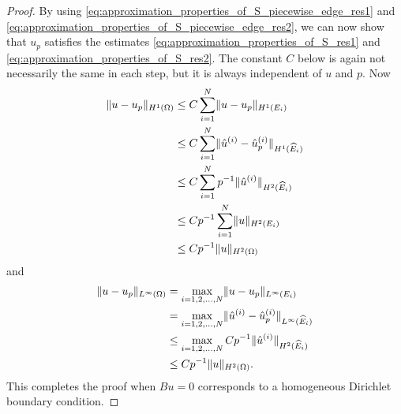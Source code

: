 \documentclass[english, 12pt, a4paper, sci, utf8, a-2b, online]{aaltothesis}
\theoremstyle{definition}
\theoremstyle{plain}
\DeclarePairedDelimiter\norm{\lVert}{\rVert}
\numberwithin{equation}{section}
\begin{document}
\begin{proof}
    By using \eqref{eq:approximation_properties_of_S_piecewise_edge_res1}
    and \eqref{eq:approximation_properties_of_S_piecewise_edge_res2},
    we can now show that $u_p$ satisfies the estimates
    \eqref{eq:approximation_properties_of_S_res1} and
    \eqref{eq:approximation_properties_of_S_res2}.
    The constant $C$ below is again not necessarily the same in each step,
    but it is always independent of $u$ and $p$. Now
    \begin{align*}
        \norm{u - u_p}_{H^1(\Omega)}
        &\leq C \sum_{i=1}^{N} \norm{u - u_p}_{H^1(E_i)} \\
        &\leq C \sum_{i=1}^{N}
            \norm{\hat{u}^{(i)} - \hat{u}_p^{(i)}}_{H^1(\widehat{E}_i)} \\
        &\leq C \sum_{i=1}^{N} p^{-1} \norm{\hat{u}^{(i)}}_{H^2(\widehat{E}_i)} \\
        &\leq C p^{-1} \sum_{i=1}^{N} \norm{u}_{H^2(E_i)} \\
        &\leq C p^{-1} \norm{u}_{H^2(\Omega)}
    \end{align*}
    and
    \begin{align*}
        \norm{u - u_p}_{L^{\infty}(\Omega)}
        &= \max_{i=1,2,\dotsc,N} \norm{u - u_p}_{L^{\infty}(E_i)} \\
        &= \max_{i=1,2,\dotsc,N}
            \norm{\hat{u}^{(i)} - \hat{u}_p^{(i)}}_{L^{\infty}(\widehat{E}_i)} \\
        &\leq \max_{i=1,2,\dotsc,N} C p^{-1}
            \norm{\hat{u}^{(i)}}_{H^2(\widehat{E}_i)} \\
        &\leq C p^{-1} \norm{u}_{H^2(\Omega)}.
    \end{align*}
    This completes the proof when $Bu=0$ corresponds to a homogeneous
    Dirichlet boundary condition.


\end{proof}
\end{document}
